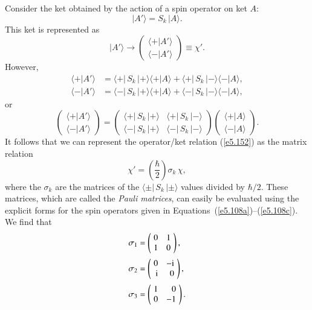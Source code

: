Consider the ket obtained by the action of a  spin operator on 
ket $A$:
\begin{equation}\label{e5.152}
|A'\rangle = S_k \,|A\rangle.
\end{equation}
This ket is represented as
\begin{equation}
|A'\rangle 
\rightarrow
\left(\!\begin{array}{c}\langle +|A'\rangle\\
\langle -|A'\rangle\end{array}\!\right)\equiv \chi'.
\end{equation}
However,
\begin{align}
\langle + |A'\rangle &= \langle + |\,S_k\,| +\rangle \langle +|A\rangle
+ \langle +|\,S_k\, |-\rangle \langle -|A\rangle,\\[0.5ex]
\langle - |A'\rangle &= \langle - |\,S_k\,| +\rangle \langle +|A\rangle
+ \langle -|\,S_k\, |-\rangle \langle -|A\rangle,
\end{align}
or
\begin{equation}
\left(\!\begin{array}{c}\langle +|A'\rangle\\[0.5ex]
\langle -|A'\rangle\end{array}\!\right) = 
\left(\!\begin{array}{cc}
\langle + |\,S_k\,| +\rangle&\langle +|\,S_k\, |-\rangle\\[0.5ex]
\langle - |\,S_k\,| +\rangle& \langle -|\,S_k\, |-\rangle\end{array}\!\right)
\left(\!\begin{array}{c}\langle +|A\rangle\\[0.5ex]
\langle -|A\rangle\end{array}\!\right).\label{e5.155}
\end{equation}
It follows that we can represent the operator/ket relation
(\ref{e5.152})  as the matrix relation
\begin{equation}
\chi' =\left( \frac{\hbar}{2}\right)\sigma_k \,\chi,
\end{equation}
where the $\sigma_k$ are the matrices of the $\langle \pm |\,S_k\,|\pm \rangle$
values divided by $\hbar/2$. These matrices, which are called the
{\em Pauli matrices}, can easily be evaluated using  the explicit forms for the
spin operators given in Equations~(\ref{e5.108a})--(\ref{e5.108c}). We find that
\begin{align}\label{e5.157a}
\sigma_1 &= \left(\!\begin{array}{rr} 0 &1\\1&0\end{array}\!\right),\\[0.5ex]
\sigma_2 &= \left(\!\begin{array}{rr} 0 &-{\rm i}\\{\rm i}&0\end{array}\!\right),\\[0.5ex]
\sigma_3 &= \left(\!\begin{array}{rr} 1 &0\\0&-1\end{array}\!\right).\label{e5.157c}
\end{align}
